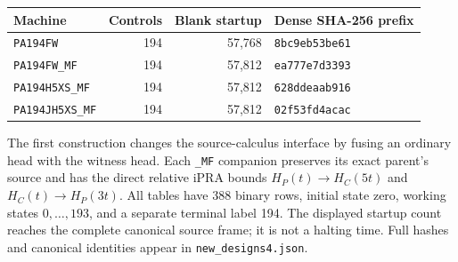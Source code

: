 \begin{center}
\small
\begin{tabular}{lrrl}
\hline
Machine&Controls&Blank startup&Dense SHA-256 prefix\\\hline
\texttt{PA194FW}&194&57,768&\texttt{8bc9eb53be61}\\
\texttt{PA194FW\_MF}&194&57,812&\texttt{ea777e7d3393}\\
\texttt{PA194H5XS\_MF}&194&57,812&\texttt{628ddeaab916}\\
\texttt{PA194JH5XS\_MF}&194&57,812&\texttt{02f53fd4acac}\\\hline
\end{tabular}
\end{center}
The first construction changes the source-calculus interface by fusing
an ordinary head with the witness head.  Each \texttt{\_MF} companion
preserves its exact parent's source and has the direct relative iPRA
bounds $H_P(t)\to H_C(5t)$ and $H_C(t)\to H_P(3t)$.
All tables have 388 binary rows, initial state zero, working states
$0,\ldots,193$, and a separate terminal label 194.  The displayed startup
count reaches the complete canonical source frame; it is not a halting
time.  Full hashes and canonical identities appear in
\texttt{new\_designs4.json}.
